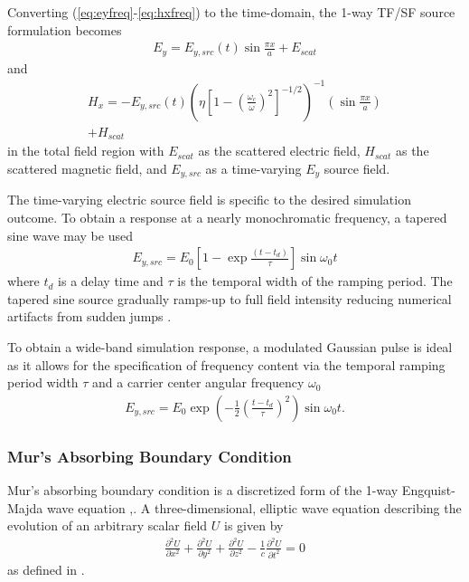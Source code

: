 Converting  (\ref{eq:eyfreq}-\ref{eq:hxfreq}) to the time-domain, the 1-way TF/SF source formulation becomes
\begin{align}
	E_y=E_{y,src}(t)\sin{\frac{\pi x}{a}} + E_{scat}
	\label{eq:tfsf-ey}
\end{align}
and
\begin{multline}
	H_x = -E_{y,src}(t)\left(\eta\left[1-\left(\frac{\omega_c}{\omega}\right)^2\right]^{-1/2}\right)^{-1}\left(\sin{\frac{\pi x}{a}}\right) \\ + H_{scat}
	\label{eq:tfsf-hx}
\end{multline}
in the total field region with $E_{scat}$ as the scattered electric field, $H_{scat}$ as the scattered magnetic field, and $E_{y,src}$ as a time-varying $E_y$ source field. 

The time-varying electric source field is specific to the desired simulation outcome. To obtain a response at a nearly monochromatic frequency, a tapered sine wave may be used 
\begin{align}
	E_{y,src} = E_0\left[1 - \exp{\frac{(t - t_d)}{\tau}}\right]\sin{\omega_0 t}
\end{align}
where $t_d$ is a delay time and $\tau$ is the temporal width of the ramping period. The tapered sine source gradually ramps-up to full field intensity reducing numerical artifacts from sudden jumps \cite{rothlecnotes}.

To obtain a wide-band simulation response, a modulated Gaussian pulse is ideal as it allows for the specification of frequency content via the temporal ramping period width $\tau$ and a carrier center angular frequency $\omega_0$ \cite{rothlecnotes}  
\begin{align}
	E_{y,src} = E_0\exp{\left(-\frac{1}{2}\left(\frac{t-t_d}{\tau}\right)^2\right)}\sin{\omega_0t}.
\end{align}

\subsubsection{Mur's Absorbing Boundary Condition}
\label{subsubsec:murtheory}
Mur's absorbing boundary condition is a discretized form of the 1-way Engquist-Majda wave equation \cite{rothlecnotes},\cite{taftlovefdtd}. A three-dimensional, elliptic wave equation describing the evolution of an arbitrary scalar field $U$ is given by
\begin{align}
	\frac{\partial^2 U}{\partial x^2}+\frac{\partial^2 U}{\partial y^2}+\frac{\partial^2 U}{\partial z^2}-\frac{1}{c}\frac{\partial^2 U}{\partial t^2}=0
	\label{eq:scalarelliptic}
\end{align}
as defined in \cite{taftlovefdtd}.

